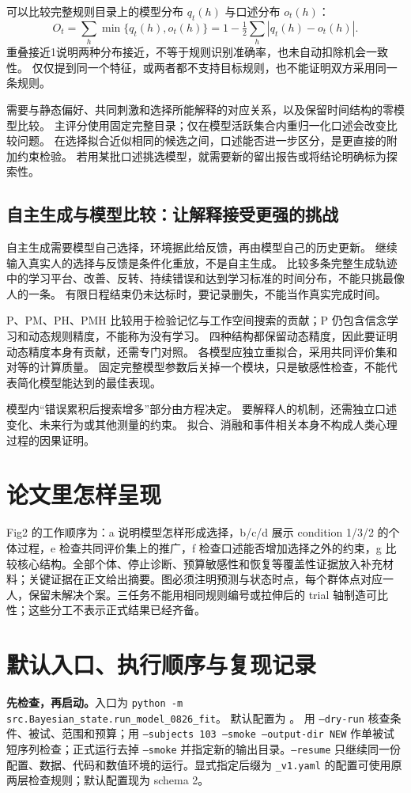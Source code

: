 \documentclass[11pt]{article}
\newcommand{\term}[1]{\textbf{#1}}
\begin{document}
可以比较完整规则目录上的模型分布 $q_t(h)$ 与口述分布 $o_t(h)$：
\begin{equation}
 O_t=\sum_h\min\{q_t(h),o_t(h)\}=1-\tfrac12\sum_h|q_t(h)-o_t(h)|.
\end{equation}
重叠接近1说明两种分布接近，不等于规则识别准确率，也未自动扣除机会一致性。
仅仅提到同一个特征，或两者都不支持目标规则，也不能证明双方采用同一条规则。

需要与静态偏好、共同刺激和选择所能解释的对应关系，以及保留时间结构的零模型比较。
主评分使用固定完整目录；仅在模型活跃集合内重归一化口述会改变比较问题。
在选择拟合近似相同的候选之间，口述能否进一步区分，是更直接的附加约束检验。
若用某批口述挑选模型，就需要新的留出报告或将结论明确标为探索性。

\subsection{自主生成与模型比较：让解释接受更强的挑战}
自主生成需要模型自己选择，环境据此给反馈，再由模型自己的历史更新。
继续输入真实人的选择与反馈是条件化重放，不是自主生成。
比较多条完整生成轨迹中的学习平台、改善、反转、持续错误和达到学习标准的时间分布，不能只挑最像人的一条。
有限日程结束仍未达标时，要记录删失，不能当作真实完成时间。

P、PM、PH、PMH 比较用于检验记忆与工作空间搜索的贡献；P 仍包含信念学习和动态规则精度，不能称为没有学习。
四种结构都保留动态精度，因此要证明动态精度本身有贡献，还需专门对照。
各模型应独立重拟合，采用共同评价集和对等的计算质量。
固定完整模型参数后关掉一个模块，只是敏感性检查，不能代表简化模型能达到的最佳表现。

模型内“错误累积后搜索增多”部分由方程决定。
要解释人的机制，还需独立口述变化、未来行为或其他测量的约束。
拟合、消融和事件相关本身不构成人类心理过程的因果证明。

\section{论文里怎样呈现}
Fig2 的工作顺序为：a 说明模型怎样形成选择，b/c/d 展示 condition 1/3/2 的个体过程，e 检查共同评价集上的推广，f 检查口述能否增加选择之外的约束，g 比较核心结构。全部个体、停止诊断、预算敏感性和恢复等覆盖性证据放入补充材料；关键证据在正文给出摘要。图必须注明预测与状态时点，每个群体点对应一人，保留未解决个案。三任务不能用相同规则编号或拉伸后的 trial 轴制造可比性；这些分工不表示正式结果已经齐备。

\section{默认入口、执行顺序与复现记录}
\term{先检查，再启动。}入口为 \texttt{python -m src.Bayesian\_state.run\_model\_0826\_fit}。
默认配置为 。
用 \texttt{--dry-run} 核查条件、被试、范围和预算；用 \texttt{--subjects 103 --smoke --output-dir NEW} 作单被试短序列检查；正式运行去掉 \texttt{--smoke} 并指定新的输出目录。\texttt{--resume} 只继续同一份配置、数据、代码和数值环境的运行。显式指定后缀为 \texttt{\_v1.yaml} 的配置可使用原两层检查规则；默认配置现为 schema 2。
\end{document}
